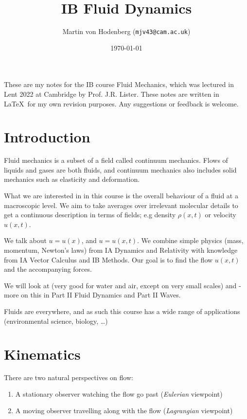 \documentclass[a4paper]{scrartcl}
\title{IB Fluid Dynamics}
\author{Martin von Hodenberg (\texttt{mjv43@cam.ac.uk})}
\date{\today}
\begin{document}
\maketitle


These are my notes for the IB course Fluid Mechanics, which was lectured in Lent 2022 at Cambridge by Prof. J.R. Lister. These notes are written in \LaTeX  \ for my own revision purposes. Any suggestions or feedback is welcome.



\tableofcontents
\newpage
\section{Introduction}
Fluid mechanics is a subset of a field called continuum mechanics. Flows of liquids and gases are both fluids, and continuum mechanics also includes solid mechanics such as elasticity and deformation. 

What we are interested in in this course is the overall behaviour of a fluid at a macroscopic level. We aim to take averages over irrelevant molecular details to get a continuous description in terms of fields; e.g density $\rho (x,t)$ or velocity $u (x,t)$.

We talk about  $u=u (x)$, and  $u=u (x,t)$. We combine simple physics (mass, momentum, Newton's laws) from IA Dynamics and Relativity with knowledge from IA Vector Calculus and IB Methods. Our goal is to find the flow $u (x,t)$ and the accompanying forces. 

We will look at  (very good for water and air, except on very small scales) and  - more on this in Part II Fluid Dynamics and Part II Waves.

Fluids are everywhere, and as such this course has a wide range of applications (environmental science, biology, \ldots)

\section{Kinematics}
There are two natural perspectives on flow:
\begin{enumerate}
    \item A stationary observer watching the flow go past (\emph{Eulerian} viewpoint)
    \item A moving observer travelling along with the flow (\emph{Lagrangian} viewpoint)
\end{enumerate}
\end{document}
